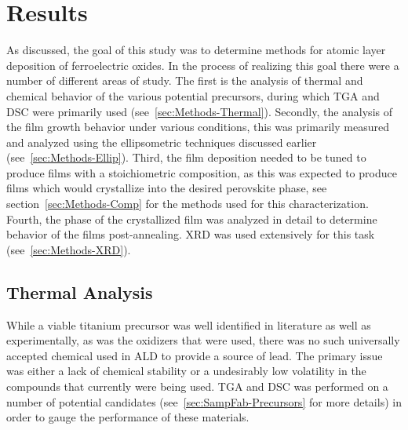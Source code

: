 \chapter{Results}
\label{ch:Results}
\thispagestyle{empty}


As discussed, the goal of this study was to determine methods for atomic layer deposition of ferroelectric oxides. In the process of realizing this goal there were a number of different areas of study. The first is the analysis of thermal and chemical behavior of the various potential precursors, during which TGA and DSC were primarily used (see~\vref{sec:Methods-Thermal}). Secondly,  the analysis of the film growth behavior under various conditions, this was primarily measured and analyzed using the ellipsometric techniques discussed earlier (see~\vref{sec:Methods-Ellip}). Third, the film deposition needed to be tuned to produce films with a stoichiometric composition, as this was expected to produce films which would crystallize into the desired perovskite phase, see section~\vref{sec:Methods-Comp} for the methods used for this characterization. Fourth, the phase of the crystallized film was analyzed in detail to determine behavior of the films post-annealing. XRD was used extensively for this task (see~\vref{sec:Methods-XRD}).



\section{Thermal Analysis}
\label{chap:Results-Thermal}

While a viable titanium precursor was well identified in literature as well as experimentally, as was the oxidizers that were used, there was no such universally accepted chemical used in ALD to provide a source of lead. The primary issue was either a lack of chemical stability or a undesirably low volatility in the compounds that currently were being used. TGA and DSC was performed on a number of potential candidates (see~\vref{sec:SampFab-Precursors} for more details) in order to gauge the performance of these materials. 


